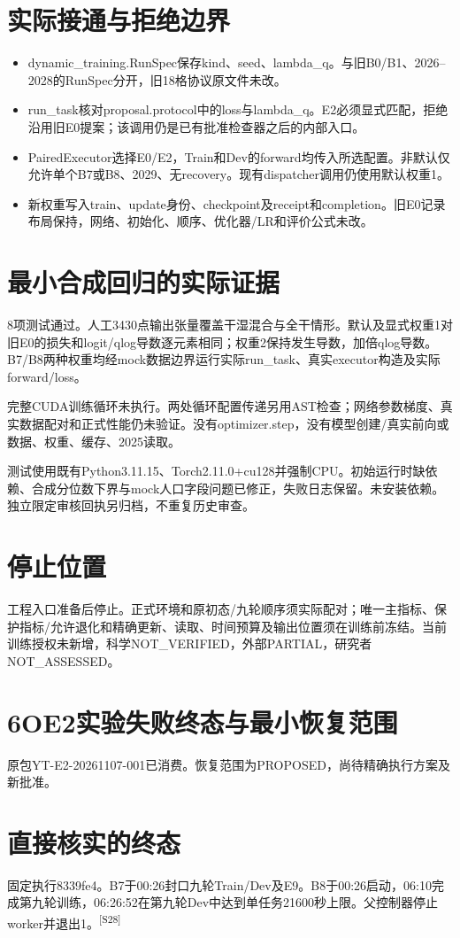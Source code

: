 \documentclass[UTF8,10.5pt,a4paper,fontset=none]{ctexart}
\newcommand{\evi}[1]{\textsuperscript{\color{muted}[#1]}}
\newcommand{\pageheading}[2]{\clearpage\section*{#1}\textcolor{muted}{#2}\par\vspace{3pt}}
\begin{document}
\section*{实际接通与拒绝边界}
\begin{itemize}
\item dynamic\_training.RunSpec保存kind、seed、lambda\_q。与旧B0/B1、2026--2028的RunSpec分开，旧18格协议原文件未改。
\item run\_task核对proposal.protocol中的loss与lambda\_q。E2必须显式匹配，拒绝沿用旧E0提案；该调用仍是已有批准检查器之后的内部入口。
\item PairedExecutor选择E0/E2，Train和Dev的forward均传入所选配置。非默认仅允许单个B7或B8、2029、无recovery。现有dispatcher调用仍使用默认权重1。
\item 新权重写入train、update身份、checkpoint及receipt和completion。旧E0记录布局保持，网络、初始化、顺序、优化器/LR和评价公式未改。
\end{itemize}

\section*{最小合成回归的实际证据}
8项测试通过。人工3430点输出张量覆盖干湿混合与全干情形。默认及显式权重1对旧E0的损失和logit/qlog导数逐元素相同；权重2保持发生导数，加倍qlog导数。B7/B8两种权重均经mock数据边界运行实际run\_task、真实executor构造及实际forward/loss。

完整CUDA训练循环未执行。两处循环配置传递另用AST检查；网络参数梯度、真实数据配对和正式性能仍未验证。没有optimizer.step，没有模型创建/真实前向或数据、权重、缓存、2025读取。

测试使用既有Python3.11.15、Torch2.11.0+cu128并强制CPU。初始运行时缺依赖、合成分位数下界与mock人口字段问题已修正，失败日志保留。未安装依赖。独立限定审核回执另归档，不重复历史审查。

\section*{停止位置}
工程入口准备后停止。正式环境和原初态/九轮顺序须实际配对；唯一主指标、保护指标/允许退化和精确更新、读取、时间预算及输出位置须在训练前冻结。当前训练授权未新增，科学NOT\_VERIFIED，外部PARTIAL，研究者NOT\_ASSESSED。

\pageheading{6O\quad E2实验失败终态与最小恢复范围}{原包YT-E2-20261107-001已消费。恢复范围为PROPOSED，尚待精确执行方案及新批准。}
\section*{直接核实的终态}
固定执行8339fe4。B7于00:26封口九轮Train/Dev及E9。B8于00:26启动，06:10完成第九轮训练，06:26:52在第九轮Dev中达到单任务21600秒上限。父控制器停止worker并退出1。\evi{S28}
\end{document}
